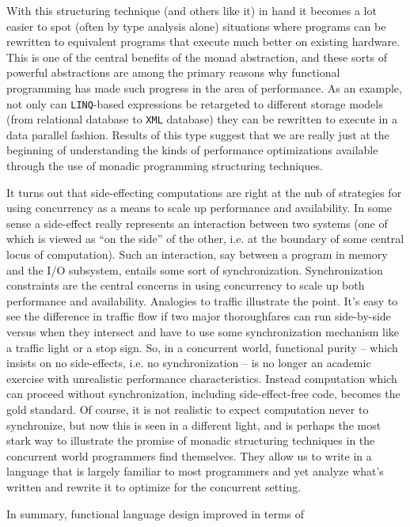With this structuring technique (and others like it) in hand it
becomes a lot easier to spot (often by type analysis alone) situations
where programs can be rewritten to equivalent programs that execute
much better on existing hardware. This is one of the central benefits
of the monad abstraction, and these sorts of powerful abstractions are
among the primary reasons why functional programming has made such
progress in the area of performance. As an example, not only can
\texttt{LINQ}-based expressions be retargeted to different
storage models (from relational database to \texttt{XML} database)
they can be rewritten to execute in a data parallel fashion. Results
of this type suggest that we are really just at the beginning of
understanding the kinds of performance optimizations available through
the use of monadic programming structuring techniques.

It turns out that side-effecting computations are right at the nub of
strategies for using concurrency as a means to scale up performance
and availability. In some sense a side-effect really represents an
interaction between two systems (one of which is viewed as ``on the
side'' of the other, i.e. at the boundary of some central locus of
computation). Such an interaction, say between a program in memory and
the I/O subsystem, entails some sort of
synchronization. Synchronization constraints are the central concerns
in using concurrency to scale up both performance and
availability. Analogies to traffic illustrate the point. It's easy to
see the difference in traffic flow if two major thoroughfares can run
side-by-side versus when they intersect and have to use some
synchronization mechanism like a traffic light or a stop sign. So, in
a concurrent world, functional purity -- which insists on no
side-effects, i.e. no synchronization -- is no longer an academic
exercise with unrealistic performance characteristics. Instead
computation which can proceed without synchronization, including
side-effect-free code, becomes the gold standard. Of course, it is not
realistic to expect computation never to synchronize, but now this is
seen in a different light, and is perhaps the most stark way to
illustrate the promise of monadic structuring techniques in the
concurrent world programmers find themselves. They allow us to write
in a language that is largely familiar to most programmers and yet
analyze what's written and rewrite it to optimize for the concurrent
setting.

In summary, functional language design improved in terms of 

